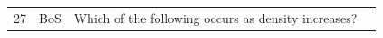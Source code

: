 \documentclass[10pt]{article}
\begin{document}
\begin{tiny}
\begin{longtable}{|r|p{0.375in}|p{1.275in}|p{3.5in}|}
27 &          BoS &                                                                                                                                                                                                                              Which of the following occurs as density increases? &                                                                                                                                                                                                                                                                                                                                                                                                                                                                                                                                                                                                                                                                                                                                                                                                                                                                                                                                                                                                                                                                                                                                                                                                                                                                                                                                                                                                                                                                                                                                                                                                                                                                                                                                                                                                                                                                                                                                                                                                                                                                                                                                                                                                                                                                                                                                                                                                                                                                                                                                                                                                                                                                                                                                                                                                                                                                                                                                                                                                                                                                                               
\end{longtable}
\end{tiny}
\end{document}
